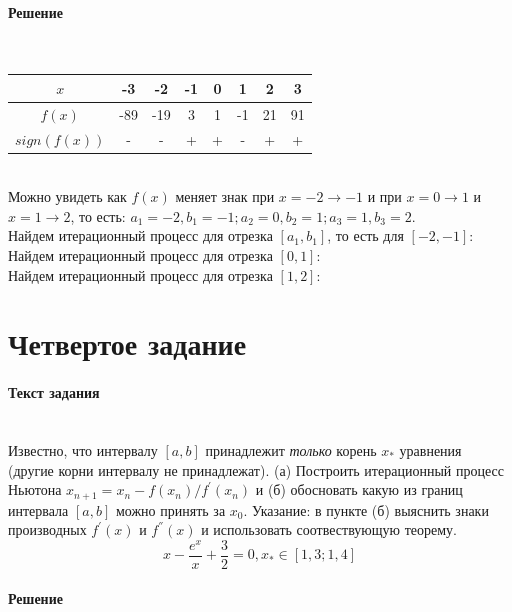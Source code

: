 \paragraph{Решение} ~\\[3mm]
\begin{tabular}{| c | c | c | c | c | c | c | c |}
  \hline
  $x$ & -3 & -2 & -1 & 0 & 1 & 2 & 3 \\
  \hline
  $f(x)$ & -89 & -19 & 3 & 1 & -1 & 21 & 91 \\
  \hline
  $sign(f(x))$ & - & - & + & + & - & + & + \\
  \hline
\end{tabular}\\[2mm]
Можно увидеть как $f(x)$ меняет знак при $x = -2 \rightarrow -1$ и при $x = 0 \rightarrow 1$ и $x = 1 \rightarrow 2$, то есть: $a_{1} = -2, b_{1} = -1; a_{2} = 0, b_{2} = 1; a_{3} = 1, b_{3} = 2$.\\[2mm]
Найдем итерационный процесс для отрезка $\left[a_{1}, b_{1}\right]$, то есть для $\left[-2, -1\right]$:\\
Найдем итерационный процесс для отрезка $\left[ 0, 1\right]$:\\
Найдем итерационный процесс для отрезка $\left[1, 2 \right]$:\\

\section{Четвертое задание}

\paragraph{Текст задания} ~\\
Известно, что интервалу $\left[a, b\right]$ принадлежит \textit{\textsl{только}} корень $x_{*}$ уравнения (другие корни интервалу не принадлежат). (а) Построить итерационный процесс Ньютона $x_{n+1} = x_{n} -f(x_{n})/f^{'}(x_{n})$ и (б) обосновать какую из границ интервала $\left[a, b\right]$ можно принять за $x_{0}$. Указание: в пункте (б) выяснить знаки производных $f^{'}(x)$ и $f^{''}(x)$ и использовать соотвествующую теорему.\\[3mm]
\[
  x - \frac{e^{x}}{x} + \frac{3}{2} = 0, x_{*} \in \left[1, 3; 1, 4\right]
\]

\paragraph{Решение} ~\\

